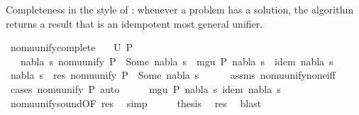 \begin{isabellebody}
\isamarkupfalse%
%
\endisatagproof
{\isafoldproof}%
%
\isadelimproof
%
\endisadelimproof
%
\begin{isamarkuptext}%
Completeness in the style of : whenever a problem has a
solution, the algorithm returns a result that is an idempotent most general unifier.%
\end{isamarkuptext}\isamarkuptrue%
\isamarkupfalse%
\ nomu{\isacharunderscore}{\kern0pt}unify{\isacharunderscore}{\kern0pt}complete{\isacharcolon}{\kern0pt}\isanewline
\ \ \ {\isachardoublequoteopen}U\ P\ {\isasymnoteq}\ {\isacharbraceleft}{\kern0pt}{\isacharbraceright}{\kern0pt}{\isachardoublequoteclose}\isanewline
\ \ \ {\isachardoublequoteopen}{\isasymexists}nabla\ s{\isachardot}{\kern0pt}\ nomu{\isacharunderscore}{\kern0pt}unify\ P\ {\isacharequal}{\kern0pt}\ Some\ {\isacharparenleft}{\kern0pt}nabla{\isacharcomma}{\kern0pt}\ s{\isacharparenright}{\kern0pt}\ {\isasymand}\ mgu\ P\ {\isacharparenleft}{\kern0pt}nabla{\isacharcomma}{\kern0pt}\ s{\isacharparenright}{\kern0pt}\ {\isasymand}\ idem\ {\isacharparenleft}{\kern0pt}nabla{\isacharcomma}{\kern0pt}\ s{\isacharparenright}{\kern0pt}{\isachardoublequoteclose}\isanewline
%
\isadelimproof
%
\endisadelimproof
%
\isatagproof
{}\isamarkupfalse%
{\isacharminus}{\kern0pt}\isanewline
\ \ \isamarkupfalse%
\ nabla\ s\ \ res{\isacharcolon}{\kern0pt}\ {\isachardoublequoteopen}nomu{\isacharunderscore}{\kern0pt}unify\ P\ {\isacharequal}{\kern0pt}\ Some\ {\isacharparenleft}{\kern0pt}nabla{\isacharcomma}{\kern0pt}\ s{\isacharparenright}{\kern0pt}{\isachardoublequoteclose}\isanewline
\ \ \ \ \isamarkupfalse%
\ assms\ nomu{\isacharunderscore}{\kern0pt}unify{\isacharunderscore}{\kern0pt}none{\isacharunderscore}{\kern0pt}iff\ \isamarkupfalse%
\ {\isacharparenleft}{\kern0pt}cases\ {\isachardoublequoteopen}nomu{\isacharunderscore}{\kern0pt}unify\ P{\isachardoublequoteclose}{\isacharparenright}{\kern0pt}\ auto\isanewline
\ \ \isamarkupfalse%
\ \isamarkupfalse%
\ {\isachardoublequoteopen}mgu\ P\ {\isacharparenleft}{\kern0pt}nabla{\isacharcomma}{\kern0pt}\ s{\isacharparenright}{\kern0pt}{\isachardoublequoteclose}\ {\isachardoublequoteopen}idem\ {\isacharparenleft}{\kern0pt}nabla{\isacharcomma}{\kern0pt}\ s{\isacharparenright}{\kern0pt}{\isachardoublequoteclose}\isanewline
\ \ \ \ \isamarkupfalse%
\ nomu{\isacharunderscore}{\kern0pt}unify{\isacharunderscore}{\kern0pt}sound{\isacharbrackleft}{\kern0pt}OF\ res{\isacharbrackright}{\kern0pt}\ \isamarkupfalse%
\ simp{\isacharplus}{\kern0pt}\isanewline
\ \ \isamarkupfalse%
\ \isamarkupfalse%
\ {\isacharquery}{\kern0pt}thesis\ \isamarkupfalse%
\ res\ \isamarkupfalse%
\ blast\isanewline
{}\isamarkupfalse%
%
\endisatagproof
{\isafoldproof}%
%
\isadelimproof
\isanewline
%
\endisadelimproof
\isanewline
%
\isadelimtheory
%
\endisadelimtheory
%
\isatagtheory
%
\endisatagtheory
{\isafoldtheory}%
%
\isadelimtheory
%
\endisadelimtheory
%
\end{isabellebody}%
